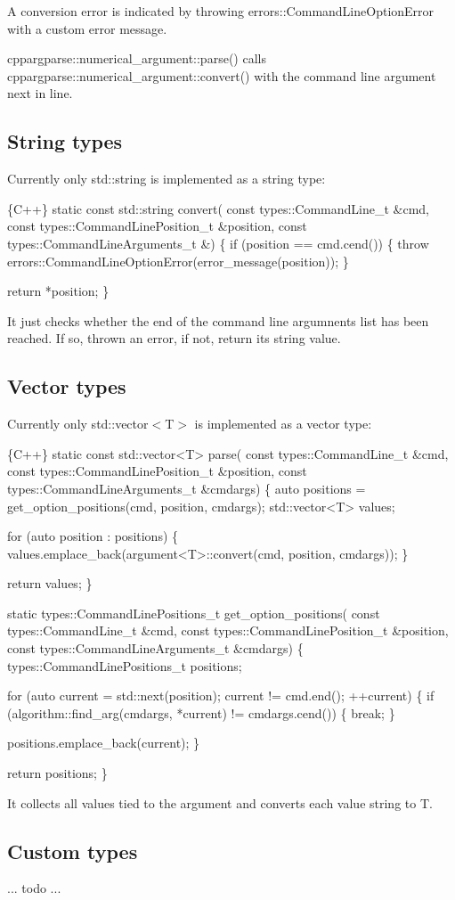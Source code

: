 A conversion error is indicated by throwing {\ttfamily errors\+::\+Command\+Line\+Option\+Error} with a custom error message.

{\ttfamily cppargparse\+::numerical\+\_\+argument\+::parse()} calls {\ttfamily cppargparse\+::numerical\+\_\+argument\+::convert()} with the command line argument next in line.

\subsection*{String types}

Currently only {\ttfamily std\+::string} is implemented as a string type\+: 
\begin{DoxyCode}
\{C++\}
static const std::string convert(
        const types::CommandLine\_t &cmd,
        const types::CommandLinePosition\_t &position,
        const types::CommandLineArguments\_t &)
\{
    if (position == cmd.cend())
    \{
        throw errors::CommandLineOptionError(error\_message(position));
    \}

    return *position;
\}
\end{DoxyCode}


It just checks whether the end of the command line argumnents list has been reached. If so, thrown an error, if not, return its string value.

\subsection*{Vector types}

Currently only {\ttfamily std\+::vector$<$T$>$} is implemented as a vector type\+: 
\begin{DoxyCode}
\{C++\}
static const std::vector<T> parse(
        const types::CommandLine\_t &cmd,
        const types::CommandLinePosition\_t &position,
        const types::CommandLineArguments\_t &cmdargs)
\{
    auto positions = get\_option\_positions(cmd, position, cmdargs);
    std::vector<T> values;

    for (auto position : positions)
    \{
        values.emplace\_back(argument<T>::convert(cmd, position, cmdargs));
    \}

    return values;
\}


static types::CommandLinePositions\_t get\_option\_positions(
        const types::CommandLine\_t &cmd,
        const types::CommandLinePosition\_t &position,
        const types::CommandLineArguments\_t &cmdargs)
\{
    types::CommandLinePositions\_t positions;

    for (auto current = std::next(position); current != cmd.end(); ++current)
    \{
        if (algorithm::find\_arg(cmdargs, *current) != cmdargs.cend())
        \{
            break;
        \}

        positions.emplace\_back(current);
    \}

    return positions;
\}
\end{DoxyCode}


It collects all values tied to the argument and converts each value string to {\ttfamily T}.

\subsection*{Custom types}

... todo ... 